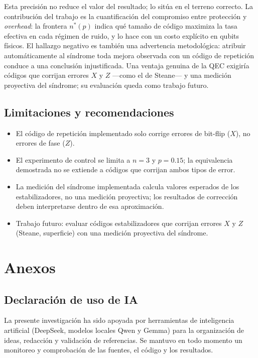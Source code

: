 \documentclass[12pt]{report}
\begin{document}
Esta precisión no reduce el valor del resultado; lo sitúa en el terreno correcto.
La contribución del trabajo es la cuantificación del compromiso entre protección
y \textit{overhead}: la frontera \(n^{*}(p)\) indica qué tamaño de código
maximiza la tasa efectiva en cada régimen de ruido, y lo hace con un costo
explícito en qubits físicos. El hallazgo negativo es también una advertencia
metodológica: atribuir automáticamente al síndrome toda mejora observada con un
código de repetición conduce a una conclusión injustificada. Una ventaja genuina
de la QEC exigiría códigos que corrijan errores \(X\) y \(Z\) —como el de
Steane— y una medición proyectiva del síndrome; su evaluación queda como trabajo
futuro.

\section{Limitaciones y recomendaciones}
\begin{itemize}
    \item El código de repetición implementado solo corrige errores de bit-flip
    (\(X\)), no errores de fase (\(Z\)).
    \item El experimento de control se limita a \(n=3\) y \(p=0.15\); la
    equivalencia demostrada no se extiende a códigos que corrijan ambos tipos de
    error.
    \item La medición del síndrome implementada calcula valores esperados de los
    estabilizadores, no una medición proyectiva; los resultados de corrección
    deben interpretarse dentro de esa aproximación.
    \item Trabajo futuro: evaluar códigos estabilizadores que corrijan errores
    \(X\) y \(Z\) (Steane, superficie) con una medición proyectiva del síndrome.
\end{itemize}

\appendix
\chapter{Anexos}

\section{Declaración de uso de IA}
La presente investigación ha sido apoyada por herramientas de inteligencia artificial (DeepSeek, modelos locales Qwen y Gemma) para la organización de ideas, redacción y validación de referencias. Se mantuvo en todo momento un monitoreo y comprobación de las fuentes, el código y los resultados.
\end{document}
